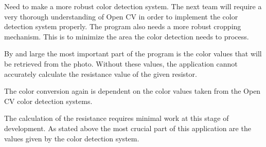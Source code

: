 \documentclass[12pt]{article}
\begin{document}
Need to make a more robust color detection system. The next team will require a very thorough understanding of Open CV in order to implement the color detection system properly. The program also needs a more robust cropping mechanism. This is to minimize the area the color detection needs to process. 

By and large the most important part of the program is the color values that will be retrieved from the photo. Without these values, the application cannot accurately calculate the resistance value of the given resistor.

The color conversion again is dependent on the color values taken from the Open CV color detection systems.

The calculation of the resistance requires minimal work at this stage of development. As stated above the most crucial part of this application are the values given by the color detection system.
\end{document}
